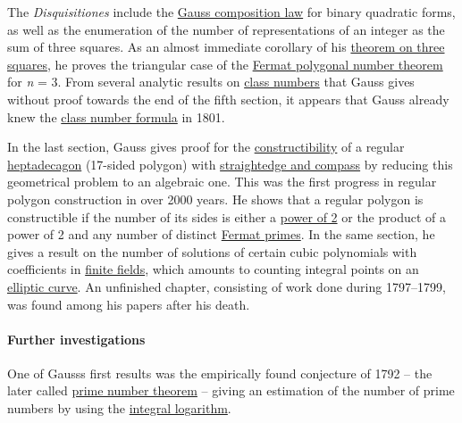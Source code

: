 The \emph{Disquisitiones} include the \href{https://en.wikipedia.org/wiki/Gauss_composition_law}{Gauss composition law} for binary quadratic forms, as well as the enumeration of the number of representations of an integer as the sum of three squares. As an almost immediate corollary of his \href{https://en.wikipedia.org/wiki/Legendre's_three-square_theorem}{theorem on three squares}, he proves the triangular case of the \href{https://en.wikipedia.org/wiki/Fermat_polygonal_number_theorem}{Fermat polygonal number theorem} for \emph{n} = 3. From several analytic results on \href{https://en.wikipedia.org/wiki/Ideal_class_group}{class numbers} that Gauss gives without proof towards the end of the fifth section, it appears that Gauss already knew the \href{https://en.wikipedia.org/wiki/Class_number_formula}{class number formula} in 1801.

In the last section, Gauss gives proof for the \href{https://en.wikipedia.org/wiki/Constructible_polygon}{constructibility} of a regular \href{https://en.wikipedia.org/wiki/Heptadecagon}{heptadecagon} (17-sided polygon) with \href{https://en.wikipedia.org/wiki/Compass_and_straightedge_constructions}{straightedge and compass} by reducing this geometrical problem to an algebraic one. This was the first progress in regular polygon construction in over 2000 years. He shows that a regular polygon is constructible if the number of its sides is either a \href{https://en.wikipedia.org/wiki/Power_of_2}{power of 2} or the product of a power of 2 and any number of distinct \href{https://en.wikipedia.org/wiki/Fermat_prime}{Fermat primes}. In the same section, he gives a result on the number of solutions of certain cubic polynomials with coefficients in \href{https://en.wikipedia.org/wiki/Finite_field}{finite fields}, which amounts to counting integral points on an \href{https://en.wikipedia.org/wiki/Elliptic_curve}{elliptic curve}. An unfinished chapter, consisting of work done during 1797--1799, was found among his papers after his death.


\paragraph{Further investigations}\label{Further_investigations}

One of Gauss\textquotesingle s first results was the empirically found conjecture of 1792 -- the later called \href{https://en.wikipedia.org/wiki/Prime_number_theorem}{prime number theorem} -- giving an estimation of the number of prime numbers by using the \href{https://en.wikipedia.org/wiki/Logarithmic_integral_function}{integral logarithm}.

